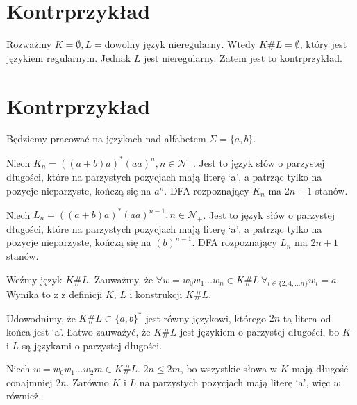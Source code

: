 \documentclass{article}
\theoremstyle{definition}
\theoremstyle{remark}
\begin{document}
\section{Kontrprzykład}

Rozważmy \(K = \emptyset, L = \text{dowolny język nieregularny}\). Wtedy
\(K \# L = \emptyset\), który jest językiem regularnym. Jednak \(L\)
jest nieregularny. Zatem jest to kontrprzykład.

\section{Kontrprzykład}

Będziemy pracować na językach nad alfabetem \(\Sigma = \{a, b\}\).

Niech \(K_n = ( (a+b)a )^* (aa)^n, n \in \mathcal{N_+}\). Jest to język słów o parzystej długości,
które na parzystych pozycjach mają literę `a', a patrząc tylko na pozycje nieparzyste, kończą się na \(a^n\).
DFA rozpoznający \(K_n\) ma \(2n+1\) stanów.





Niech \(L_n = ( (a+b)a )^* (aa)^{n-1}, n \in \mathcal{N_+}\). Jest to język słów o parzystej długości,
które na parzystych pozycjach mają literę `a', a patrząc tylko na pozycje nieparzyste, kończą się na \( (b)^{n-1}\).
DFA rozpoznający \(L_n\) ma \(2n+1\) stanów.

Weźmy język \(K \# L\). Zauważmy, że \( \forall w= w_0 w_1 \ldots w_n \in K \# L \ \forall_{i \in \{ 2, 4, \ldots n \} } w_i = a\). Wynika to z z definicji
\(K\), \(L\) i konstrukcji \(K \# L\).

Udowodnimy, że \(K \# L \subset \{ a, b \}^*\) jest równy językowi, którego \(2n\) tą litera od końca jest `a'.
Łatwo zauważyć, że \(K \# L\) jest językiem o parzystej długości, bo \(K\) i \(L\) są językami o parzystej długości.

Niech \(w = w_0 w_1 \ldots w_2m \in K \# L\). \(2n \leq 2m\), bo wszystkie słowa w \(K\) mają długość conajmniej \(2n\).
Zarówno \(K\) i \(L\) na parzystych pozycjach mają literę `a', więc \(w\) również.
\end{document}
